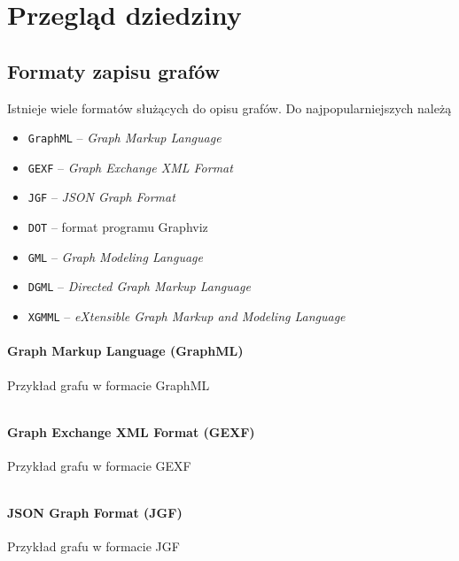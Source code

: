 \chapter{Przegląd dziedziny}
\section{Formaty zapisu grafów} \label{sec:graph-formats}
Istnieje wiele formatów służących do opisu grafów. Do najpopularniejszych należą \cite{bernard,gephi}

\begin{itemize}
\setlength\itemsep{0em}
\item \texttt{GraphML} -- \textit{Graph Markup Language}
\item \texttt{GEXF} -- \textit{Graph Exchange XML Format}
\item \texttt{JGF} -- \textit{JSON Graph Format}
\item \texttt{DOT} -- format programu Graphviz
\item \texttt{GML} -- \textit{Graph Modeling Language }
\item \texttt{DGML} -- \textit{Directed Graph Markup Language}
\item \texttt{XGMML} -- \textit{eXtensible Graph Markup and Modeling Language}
\end{itemize}

\subsubsection{Graph Markup Language (GraphML)}
\begin{listing}[H]
    \caption{Przykład grafu w formacie GraphML}
    \inputminted{xml}{example.graphml}
    \label{lst:graphml-example}
\end{listing}

\subsubsection{Graph Exchange XML Format (GEXF)}
\begin{listing}[H]
    \caption{Przykład grafu w formacie GEXF}
    \inputminted{xml}{example.gexf}
    \label{lst:gexf-example}
\end{listing}

\subsubsection{JSON Graph Format (JGF)} 
\begin{listing}[H]
    \caption{Przykład grafu w formacie JGF}
    \inputminted{json}{example.json}
    \label{lst:jgf-example}
\end{listing}

